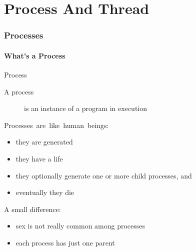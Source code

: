 \mode*
\part{Process And Thread}


\section{Processes}
\label{sec:processes}

\subsection{What's a Process}
\label{sec:whats-process}

\begin{frame}{Process}
  \begin{description}
  \item[A process] is an instance of a program in execution
  \end{description}
  \begin{minipage}{.65\linewidth}
    \begin{block}{\mbox{Processes are like human beings:}}
        \begin{itemize}
        \item[\Symbol{➠}] they are generated
        \item[\Symbol{➠}] they have a life
        \item[\Symbol{➠}] they optionally generate one or more child processes, and
        \item[\Symbol{➠}] eventually they die
        \end{itemize}
        A small difference:
        \begin{itemize}
        \item sex is not really common among processes
        \item each process has just one parent
        \end{itemize}
      \end{block}
  \end{minipage}\quad
  \begin{minipage}{.3\linewidth}
    \begin{center}
    \end{center}
  \end{minipage}
\end{frame}

